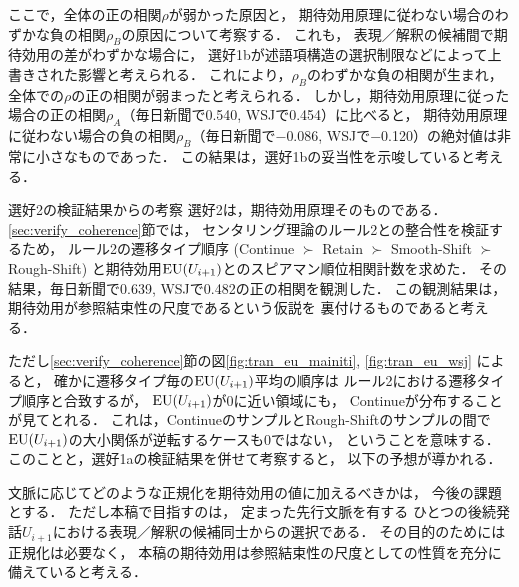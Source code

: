 \documentclass[japanese]{jnlp_1.3e}
\renewcommand{\paragraph}{}
\begin{document}
ここで，全体の正の相関$\rho$が弱かった原因と，
期待効用原理に従わない場合のわずかな負の相関$\rho_B$の原因について考察する．
これも，
表現／解釈の候補間で期待効用の差がわずかな場合に，
選好1bが述語項構造の選択制限などによって上書きされた影響と考えられる．
これにより，$\rho_B$のわずかな負の相関が生まれ，
全体での$\rho$の正の相関が弱まったと考えられる．
しかし，期待効用原理に従った場合の正の相関$\rho_A$（毎日新聞で0.540, WSJで0.454）に比べると，
期待効用原理に従わない場合の負の相関$\rho_B$（毎日新聞で$-$0.086, WSJで$-$0.120）の絶対値は非常に小さなものであった．
この結果は，選好1bの妥当性を示唆していると考える．


\paragraph{選好2の検証結果からの考察}
選好2は，期待効用原理そのものである．
\ref{sec:verify_coherence}節では，
センタリング理論のルール2との整合性を検証するため，
ルール2の遷移タイプ順序 
(Continue $\succ$ Retain $\succ$ Smooth-Shift $\succ$ Rough-Shift) 
と期待効用${\rm EU}(U_{i+1})$とのスピアマン順位相関計数を求めた．
その結果，毎日新聞で0.639, WSJで0.482の正の相関を観測した．
この観測結果は，期待効用が参照結束性の尺度であるという仮説を
裏付けるものであると考える．

ただし\ref{sec:verify_coherence}節の図\ref{fig:tran_eu_mainiti}, \ref{fig:tran_eu_wsj}
によると，
確かに遷移タイプ毎の${\rm EU}(U_{i+1})$平均の順序は
ルール2における遷移タイプ順序と合致するが，
${\rm EU}(U_{i+1})$が0に近い領域にも，
Continueが分布することが見てとれる．
これは，ContinueのサンプルとRough-Shiftのサンプルの間で
${\rm EU}(U_{i+1})$の大小関係が逆転するケースも0ではない，
ということを意味する．
このことと，選好1aの検証結果を併せて考察すると，
以下の予想が導かれる．

    \vspace{1\baselineskip}
文脈に応じてどのような正規化を期待効用の値に加えるべきかは，
今後の課題とする．
ただし本稿で目指すのは，
定まった先行文脈を有する
ひとつの後続発話$U_{i+1}$における表現／解釈の候補同士からの選択である．
その目的のためには正規化は必要なく，
本稿の期待効用は参照結束性の尺度としての性質を充分に備えていると考える．
\end{document}
